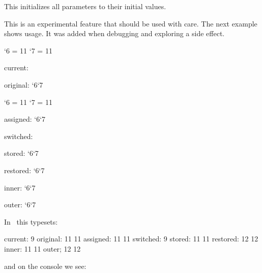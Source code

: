 \stopnewprimitive

\startnewprimitive[title={\prm {resetmathspacing}}]

This initializes all parameters to their initial values.

\stopnewprimitive

\startnewprimitive[title={\prm {restorecatcodetable}}]

This is an experimental feature that should be used with care. The next example
shows usage. It was added when debugging and exploring a side effect.

\starttyping
{}

\bgroup

    \catcode`6 = 11 \catcode`7 = 11

    \bgroup


    current: \the\catcodetable

    original: \the\catcode`6\quad \the\catcode`7

    \catcode`6 = 11 \catcode`7 = 11

    \showcodestack\catcode

    assigned: \the\catcode`6\quad \the\catcode`7

    \showcodestack\catcode

    \catcodetable\ctxcatcodes switched: \the\catcodetable

    stored: \the\catcode`6\quad \the\catcode`7

    \showcodestack\catcode

    \restorecatcodetable\ctxcatcodes

    \showcodestack\catcode

    restored: \the\catcode`6\quad \the\catcode`7

    \showcodestack\catcode

    \egroup

    \catcodetable\ctxcatcodes

    inner: \the\catcode`6\quad\the\catcode`7

\egroup

outer: \the\catcode`6\quad\the\catcode`7
\stoptyping

In \CONTEXT\ this typesets:

\starttyping
current: 9
original: 11 11
assigned: 11 11
switched: 9
stored: 11 11
restored: 12 12
inner: 11 11
outer; 12 12
\stoptyping

and on the console we see:


